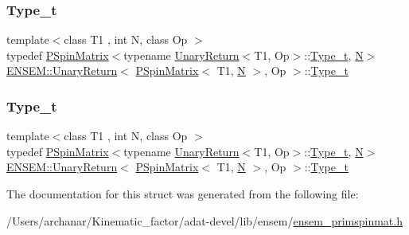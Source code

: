 \subsubsection{\texorpdfstring{Type\_t}{Type\_t}\hspace{0.1cm}{\footnotesize\ttfamily [2/3]}}
{\footnotesize\ttfamily template$<$class T1 , int N, class Op $>$ \\
typedef \mbox{\hyperlink{classENSEM_1_1PSpinMatrix}{P\+Spin\+Matrix}}$<$typename \mbox{\hyperlink{structENSEM_1_1UnaryReturn}{Unary\+Return}}$<$T1, Op$>$\+::\mbox{\hyperlink{structENSEM_1_1UnaryReturn_3_01PSpinMatrix_3_01T1_00_01N_01_4_00_01Op_01_4_a722e6dd982e4f02e3281bc8a3b8f8bfa}{Type\+\_\+t}}, \mbox{\hyperlink{adat__devel_2lib_2hadron_2operator__name__util_8cc_a7722c8ecbb62d99aee7ce68b1752f337}{N}}$>$ \mbox{\hyperlink{structENSEM_1_1UnaryReturn}{E\+N\+S\+E\+M\+::\+Unary\+Return}}$<$ \mbox{\hyperlink{classENSEM_1_1PSpinMatrix}{P\+Spin\+Matrix}}$<$ T1, \mbox{\hyperlink{adat__devel_2lib_2hadron_2operator__name__util_8cc_a7722c8ecbb62d99aee7ce68b1752f337}{N}} $>$, Op $>$\+::\mbox{\hyperlink{structENSEM_1_1UnaryReturn_3_01PSpinMatrix_3_01T1_00_01N_01_4_00_01Op_01_4_a722e6dd982e4f02e3281bc8a3b8f8bfa}{Type\+\_\+t}}}

\mbox{\label{structENSEM_1_1UnaryReturn_3_01PSpinMatrix_3_01T1_00_01N_01_4_00_01Op_01_4_a722e6dd982e4f02e3281bc8a3b8f8bfa}} 
\subsubsection{\texorpdfstring{Type\_t}{Type\_t}\hspace{0.1cm}{\footnotesize\ttfamily [3/3]}}
{\footnotesize\ttfamily template$<$class T1 , int N, class Op $>$ \\
typedef \mbox{\hyperlink{classENSEM_1_1PSpinMatrix}{P\+Spin\+Matrix}}$<$typename \mbox{\hyperlink{structENSEM_1_1UnaryReturn}{Unary\+Return}}$<$T1, Op$>$\+::\mbox{\hyperlink{structENSEM_1_1UnaryReturn_3_01PSpinMatrix_3_01T1_00_01N_01_4_00_01Op_01_4_a722e6dd982e4f02e3281bc8a3b8f8bfa}{Type\+\_\+t}}, \mbox{\hyperlink{adat__devel_2lib_2hadron_2operator__name__util_8cc_a7722c8ecbb62d99aee7ce68b1752f337}{N}}$>$ \mbox{\hyperlink{structENSEM_1_1UnaryReturn}{E\+N\+S\+E\+M\+::\+Unary\+Return}}$<$ \mbox{\hyperlink{classENSEM_1_1PSpinMatrix}{P\+Spin\+Matrix}}$<$ T1, \mbox{\hyperlink{adat__devel_2lib_2hadron_2operator__name__util_8cc_a7722c8ecbb62d99aee7ce68b1752f337}{N}} $>$, Op $>$\+::\mbox{\hyperlink{structENSEM_1_1UnaryReturn_3_01PSpinMatrix_3_01T1_00_01N_01_4_00_01Op_01_4_a722e6dd982e4f02e3281bc8a3b8f8bfa}{Type\+\_\+t}}}



The documentation for this struct was generated from the following file\+:\begin{DoxyCompactItemize}
\item 
/\+Users/archanar/\+Kinematic\+\_\+factor/adat-\/devel/lib/ensem/\mbox{\hyperlink{adat-devel_2lib_2ensem_2ensem__primspinmat_8h}{ensem\+\_\+primspinmat.\+h}}\end{DoxyCompactItemize}
